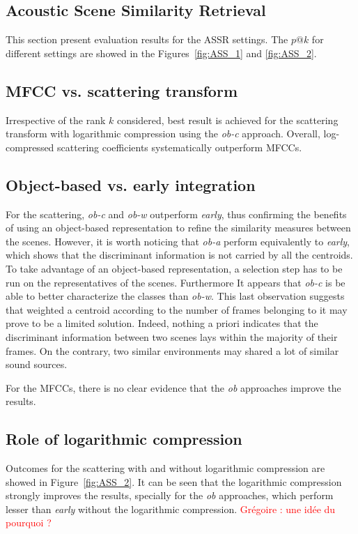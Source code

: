 \documentclass[journal]{IEEEtran}
\makeatletter
\newcommand*{\vs}{vs.\@\xspace}
\newcommand{\gl}[1]{\textcolor{red}{Gr\'egoire : #1}}
\makeatother
\begin{document}
\subsection{Acoustic Scene Similarity Retrieval}

This section present evaluation results for the ASSR settings. The $p@k$ for different settings are showed in the Figures~\ref{fig:ASS_1} and \ref{fig:ASS_2}.

\subsection*{MFCC \vs scattering transform}

Irrespective of the rank $k$ considered, best result is achieved for the scattering transform with logarithmic compression using the \emph{ob-c} approach. Overall, log-compressed scattering coefficients systematically outperform MFCCs.

\subsection*{Object-based \vs early integration}

For the scattering, \emph{ob-c} and \emph{ob-w} outperform \emph{early}, thus confirming the benefits of using an object-based representation to refine the similarity measures between the scenes. However, it is worth noticing that \emph{ob-a} perform equivalently to \emph{early}, which shows that the discriminant information is not carried by all the centroids. To take advantage of an object-based representation, a selection step has to be run on the representatives of the scenes. Furthermore It appears that \emph{ob-c} is be able to better characterize the classes than \emph{ob-w}. This last observation suggests that weighted a centroid according to the number of frames belonging to it may prove to be a limited solution. Indeed, nothing a priori indicates that the discriminant information between two scenes lays within the majority of their frames. On the contrary, two similar environments may shared a lot of similar sound sources.

For the MFCCs, there is no clear evidence that the \emph{ob} approaches improve the results.

\subsection*{Role of logarithmic compression}

Outcomes for the scattering with and without logarithmic compression are showed in Figure~\ref{fig:ASS_2}. It can be seen that the logarithmic compression strongly improves the results, specially for the \emph{ob} approaches, which perform lesser than \emph{early} without the logarithmic compression. \gl{une idée du pourquoi ?}
\end{document}

